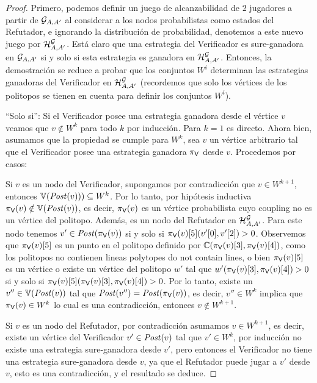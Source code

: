 \begin{proof} Primero, podemos definir un juego de alcanzabilidad de $2$ jugadores a partir de  $\StochG_{A,A'}$ al considerar a los nodos probabilistas como estados del Refutador, e ignorando la distribución de probabilidad, denotemos a este nuevo juego por $\mathcal{H}^\StochG_{A,A'}$. 
Está claro que una estrategia del Verificador es sure-ganadora en $\StochG_{A,A'}$ si y solo si esta estrategia es ganadora en $\mathcal{H}^\StochG_{A,A'}$. 
Entonces, la demostración se reduce a probar que los conjuntos $W^i$ determinan las estrategias ganadoras del Verificador en $\mathcal{H}^\StochG_{A, A'}$ (recordemos que solo los vértices de los politopos se tienen en cuenta para definir los conjuntos $W^i$). 

``Solo si'': Si el Verificador posee una estrategia ganadora desde el vértice $v$ veamos que $v \notin W^k$ para todo $k$ por inducción. 
Para $k=1$ es directo. Ahora bien, asumamos que la propiedad se cumple para $W^k$, sea $v$ un vértice arbitrario tal que el Verificador posee una estrategia ganadora $\strat{\Verifier}$ desde $v$.  Procedemos por casos:

Si $v$ es un nodo del Verificador, supongamos por contradicción que $v \in W^{k+1}$, entonces $\vertices{\post(v))}  \subseteq W^k$. 
Por lo tanto, por hipótesis inductiva $\strat{\Verifier}(v) \notin \vertices{\post(v)}$, es decir, $\strat{\Verifier}(v)$ es un vértice probabilista cuyo coupling no es un vértice del politopo. Además, es un nodo del Refutador en $\mathcal{H}^\StochG_{A,A'}$. Para este nodo tenemos $v' \in \post(\strat{\Verifier}(v))$ si y solo si $\pr{5}{\strat{\Verifier}(v)}(\pr{0}{v'}, \pr{2}{v'})>0$. 
Observemos que $\pr{5}{\strat{\Verifier}(v)}$ es un punto en el politopo definido por $\couplings{\pr{3}{\strat{\Verifier}(v)}}{\pr{4}{\strat{\Verifier}(v)}}$, 
como los politopos no contienen lineas polytopes do not contain lines, o bien $\pr{5}{\strat{\Verifier}(v)}$ es un vértice o existe un vértice del politopo $w'$ tal que   $w'(\pr{3}{\strat{\Verifier}(v)}, \pr{4}{\strat{\Verifier}(v)})>0$ si y solo si $\pr{5}{\strat{\Verifier}(v)}(\pr{3}{\strat{\Verifier}(v)}, \pr{4}{\strat{\Verifier}(v)})>0$. 
Por lo tanto, existe un $v'' \in \vertices{\post(v)}$ tal que $\post(v'') = \post(\strat{\Verifier}(v))$, es decir, $v'' \in W^k$ implica que $\strat{\Verifier}(v) \in W^{k}$ lo cual es una contradicción, entonces $v \notin W^{k+1}$. 

Si $v$ es un nodo del Refutador, por contradicción asumamos $v \in W^{k+1}$, es decir, existe un vértice del Verificador $v' \in \post(v)$ tal que 
$v' \in W^k$, por inducción no existe una estrategia sure-ganadora desde $v'$, pero entonces el Verificador no tiene una estrategia sure-ganadora desde $v$, ya que
el Refutador puede jugar a $v'$ desde $v$, esto es una contradicción, y el resultado se deduce.


\end{proof}
